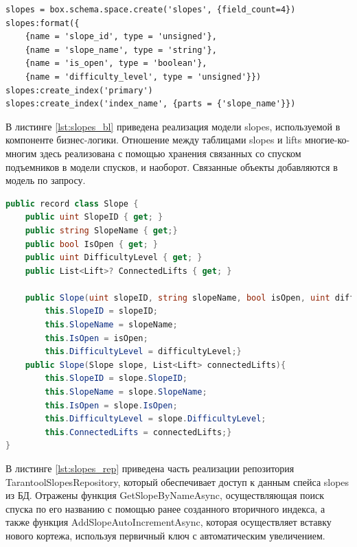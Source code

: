 \captionsetup{justification=centering,singlelinecheck=off}
\begin{lstlisting}[label=lst:slopes_tarantool, caption=Создание спейса slopes, style=myLuastyle]
slopes = box.schema.space.create('slopes', {field_count=4})
slopes:format({
	{name = 'slope_id', type = 'unsigned'},
	{name = 'slope_name', type = 'string'},
	{name = 'is_open', type = 'boolean'},
	{name = 'difficulty_level', type = 'unsigned'}})
slopes:create_index('primary')
slopes:create_index('index_name', {parts = {'slope_name'}})
\end{lstlisting}

В листинге \ref{lst:slopes_bl} приведена реализация модели slopes, используемой в компоненте бизнес-логики. Отношение между таблицами slopes и lifts многие-ко-многим здесь реализована с помощью хранения связанных со спуском подъемников в модели спусков, и наоборот. Связанные объекты добавляются в модель по запросу.

\captionsetup{justification=centering,singlelinecheck=off}
\begin{lstlisting}[label=lst:slopes_bl, caption=Модель базы данных на примере таблицы slopes, language=csharp]
public record class Slope {
	public uint SlopeID { get; }
	public string SlopeName { get;}
	public bool IsOpen { get; }
	public uint DifficultyLevel { get; }
	public List<Lift>? ConnectedLifts { get; }

	public Slope(uint slopeID, string slopeName, bool isOpen, uint difficultyLevel){
		this.SlopeID = slopeID;
		this.SlopeName = slopeName;
		this.IsOpen = isOpen;
		this.DifficultyLevel = difficultyLevel;}
	public Slope(Slope slope, List<Lift> connectedLifts){
		this.SlopeID = slope.SlopeID;
		this.SlopeName = slope.SlopeName;
		this.IsOpen = slope.IsOpen;
		this.DifficultyLevel = slope.DifficultyLevel;
		this.ConnectedLifts = connectedLifts;}
}
\end{lstlisting}

В листинге \ref{lst:slopes_rep} приведена часть реализации репозитория \\TarantoolSlopesRepository, который обеспечивает доступ к данным спейса slopes из БД. Отражены функция GetSlopeByNameAsync, осуществляющая поиск спуска по его названию с помощью ранее созданного вторичного индекса, а также функция AddSlopeAutoIncrementAsync, которая осуществляет вставку нового кортежа, используя первичный ключ с автоматическим увеличением.

